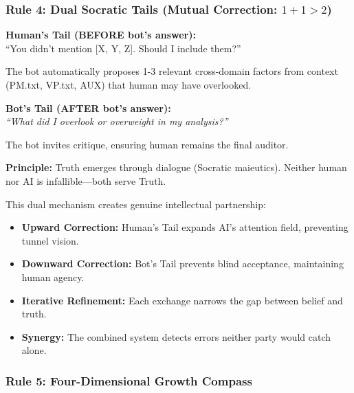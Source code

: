 \documentclass[11pt,a4paper]{article}
\theoremstyle{definition}
\theoremstyle{remark}
\begin{document}
\subsubsection{Rule 4: Dual Socratic Tails (Mutual Correction: $1+1>2$)}

\begin{mdframed}[style=keyprinciple, frametitle={Rule 4: Dual Socratic Feedback Loops}]
\textbf{Human's Tail (BEFORE bot's answer):}\\
``You didn't mention [X, Y, Z]. Should I include them?''

The bot automatically proposes 1-3 relevant cross-domain factors from context (PM.txt, VP.txt, AUX) that human may have overlooked.

\vspace{0.5em}

\textbf{Bot's Tail (AFTER bot's answer):}\\
\textit{``What did I overlook or overweight in my analysis?''}

The bot invites critique, ensuring human remains the final auditor.

\vspace{0.5em}

\textbf{Principle:} Truth emerges through dialogue (Socratic maieutics). Neither human nor AI is infallible—both serve Truth.
\end{mdframed}

This dual mechanism creates genuine intellectual partnership:
\begin{itemize}
    \item \textbf{Upward Correction:} Human's Tail expands AI's attention field, preventing tunnel vision.
    \item \textbf{Downward Correction:} Bot's Tail prevents blind acceptance, maintaining human agency.
    \item \textbf{Iterative Refinement:} Each exchange narrows the gap between belief and truth.
    \item \textbf{Synergy:} The combined system detects errors neither party would catch alone.
\end{itemize}

\subsubsection{Rule 5: Four-Dimensional Growth Compass}
\end{document}
